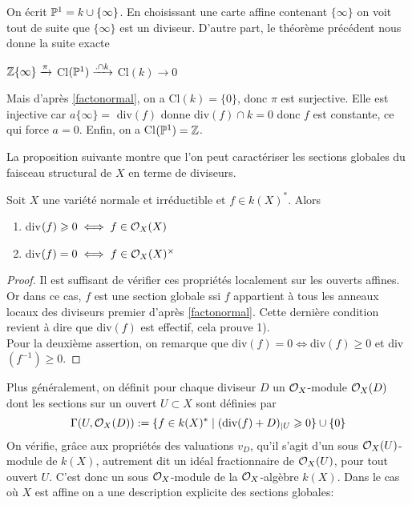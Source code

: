 \begin{ex}
On écrit $\mathbb{P} ^1=k\cup \lbrace\infty\rbrace$. En choisissant une carte affine contenant $\lbrace\infty\rbrace$ on voit tout de suite que  $\lbrace\infty\rbrace$ est un diviseur. D'autre part, le théorème précédent nous donne la suite exacte 
\begin{center}
 $\mathbb{Z} \lbrace\infty\rbrace \xrightarrow{\pi}$ Cl$(\mathbb{P} ^1) \xrightarrow{.\cap k} $ Cl$(k) \rightarrow 0 $
\end{center}
Mais d'après \ref{factonormal}, on a Cl$(k)=\lbrace 0 \rbrace$, donc $\pi$ est surjective. Elle est injective car $a\lbrace\infty\rbrace=$ div$(f)$ donne    
div$(f)\cap k = 0$ donc $f$ est constante, ce qui force $a=0$. Enfin, on a Cl$(\mathbb{P} ^1)=\mathbb{Z}$.
\end{ex}

La proposition suivante montre que l'on peut caractériser les sections globales du faisceau structural de $X$ en terme de diviseurs.

\begin{prop}
Soit $X$ une variété normale et irréductible et $f\in k(X)^*$. Alors 
\begin{enumerate}
\item div$(f)\geqslant 0\iff f \in\mathcal{O}_X(X)$
\item div$(f)= 0\iff f\in\mathcal{O}_X(X)^\times$
\end{enumerate}
\end{prop}
\begin{proof}
Il est suffisant de vérifier ces propriétés localement sur les ouverts affines. Or dans ce cas, $f$ est une section globale ssi $f$ appartient à tous les anneaux locaux des diviseurs premier d'après \ref{factonormal}. Cette dernière condition revient à dire que div$(f)$ est effectif, cela prouve 1).  \\
Pour la deuxième assertion, on remarque que div$(f)=0\iff$div$(f)\geq 0$ et div$(f^{-1})\geq 0$.
\end{proof}

Plus généralement, on définit pour chaque diviseur $D$ un $\mathcal{O}_X$-module $\mathcal{O}_X(D)$ dont les sections sur un ouvert $U\subset X$ sont définies par $$\Gamma(U,\mathcal{O}_X(D)):=\lbrace f\in k(X)^* \mid (\textrm{div}(f)+D)_{|U}\geqslant 0\rbrace\cup \lbrace 0 \rbrace$$
On vérifie, grâce aux propriétés des valuations $v_D$, qu'il s'agit d'un sous $\mathcal{O}_X(U)$-module de $k(X)$, autrement dit un idéal fractionnaire de $\mathcal{O}_X(U)$, pour tout ouvert $U$. C'est donc un sous $\mathcal{O}_X$-module de la  $\mathcal{O}_X$-algèbre $k(X)$. Dans le cas où $X$ est affine on a une description explicite des sections globales:

